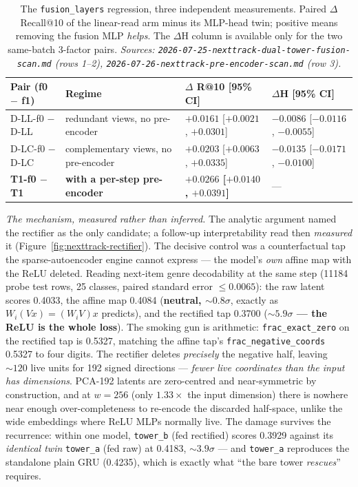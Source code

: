 \documentclass[11pt]{article}
\newcommand{\best}[1]{\textbf{#1}}
\begin{document}
\begin{table}[ht]
  \centering
  \caption{The \texttt{fusion\_layers} regression, three independent
  measurements. Paired $\Delta$ Recall@10 of the linear-read arm minus its
  MLP-head twin; positive means removing the fusion MLP \emph{helps}. The
  $\Delta$H column is available only for the two same-batch 3-factor pairs.
  \emph{Sources: \texttt{2026-07-25-nexttrack-dual-tower-fusion-scan.md} (rows
  1--2), \texttt{2026-07-26-nexttrack-pre-encoder-scan.md} (row 3).}}
  \label{tab:fusion-depth}
  {\scriptsize\setlength{\tabcolsep}{4pt}\begin{tabular}{llll}
    \toprule
    Pair (f0 $-$ f1) & Regime & $\Delta$ R@10 [95\% CI] & $\Delta$H [95\% CI] \\
    \midrule
    D-LL-f0 $-$ D-LL & redundant views, no pre-encoder & $+0.0161$ [$+0.0021$, $+0.0301$] & $-0.0086$ [$-0.0116$, $-0.0055$] \\
    D-LC-f0 $-$ D-LC & complementary views, no pre-encoder & $+0.0203$ [$+0.0063$, $+0.0335$] & $-0.0135$ [$-0.0171$, $-0.0100$] \\
    \best{T1-f0 $-$ T1} & \best{with a per-step pre-encoder} & \best{$+0.0266$ [$+0.0140$, $+0.0391$]} & --- \\
    \bottomrule
  \end{tabular}}
\end{table}

\emph{The mechanism, measured rather than inferred.} The analytic argument named
the rectifier as the only candidate; a follow-up interpretability read then
\emph{measured} it (Figure~\ref{fig:nexttrack-rectifier}). The decisive control
was a counterfactual tap the sparse-autoencoder engine cannot express --- the
model's \emph{own} affine map with the ReLU deleted. Reading next-item genre
decodability at the same step (\num{11184} probe test rows, 25 classes, paired
standard error $\le\num{0.0065}$): the raw latent scores \num{0.4033}, the
affine map \num{0.4084} (\textbf{neutral, ${\sim}0.8\sigma$}, exactly as
$W_i(Vx)=(W_iV)x$ predicts), and the rectified tap \num{0.3700}
(\textbf{${\sim}5.9\sigma$ --- the ReLU is the whole loss}). The smoking gun is
arithmetic: \texttt{frac\_exact\_zero} on the rectified tap is \num{0.5327},
matching the affine tap's \texttt{frac\_negative\_coords} \num{0.5327} to four
digits. The rectifier deletes \emph{precisely} the negative half, leaving
${\sim}120$ live units for 192 signed directions --- \emph{fewer live coordinates
than the input has dimensions}. PCA-192 latents are zero-centred and
near-symmetric by construction, and at $w=256$ (only $1.33\times$ the input
dimension) there is nowhere near enough over-completeness to re-encode the
discarded half-space, unlike the wide embeddings where ReLU MLPs normally live.
The damage survives the recurrence: within one model, \texttt{tower\_b} (fed
rectified) scores \num{0.3929} against its \emph{identical twin}
\texttt{tower\_a} (fed raw) at \num{0.4183}, ${\sim}3.9\sigma$ --- and
\texttt{tower\_a} reproduces the standalone plain GRU (\num{0.4235}), which is
exactly what ``the bare tower \emph{rescues}'' requires.
\end{document}

